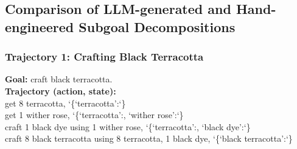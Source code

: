 \subsection{Comparison of LLM-generated and Hand-engineered Subgoal Decompositions}
\label{appx:llmgenVSEngSubgoal}

\subsubsection{Trajectory 1: Crafting Black Terracotta}

\begin{tcolorbox}[
    colback=blue!2,
    colframe=blue!40,
    colbacktitle=blue!10,
    coltitle=black,
    title=Provided Demonstration Trajectory,
    boxrule=0.3pt,
    sharp corners,
    enhanced jigsaw,
    fonttitle=\bfseries
]
\ttfamily\raggedright
{\bfseries Goal:} \;\;craft black terracotta.\\[0.2em]
{\bfseries Trajectory (action, state):}\\[0.2em]
get 8 terracotta, \char`\{`terracotta':\;\char`\}\\
get 1 wither rose, \char`\{`terracotta':\;, `wither rose':\;\char`\}\\
craft 1 black dye using 1 wither rose, \char`\{`terracotta':\;, `black dye':\;\char`\}\\
craft 8 black terracotta using 8 terracotta, 1 black dye, \char`\{`black terracotta':\;\char`\}
\end{tcolorbox}

